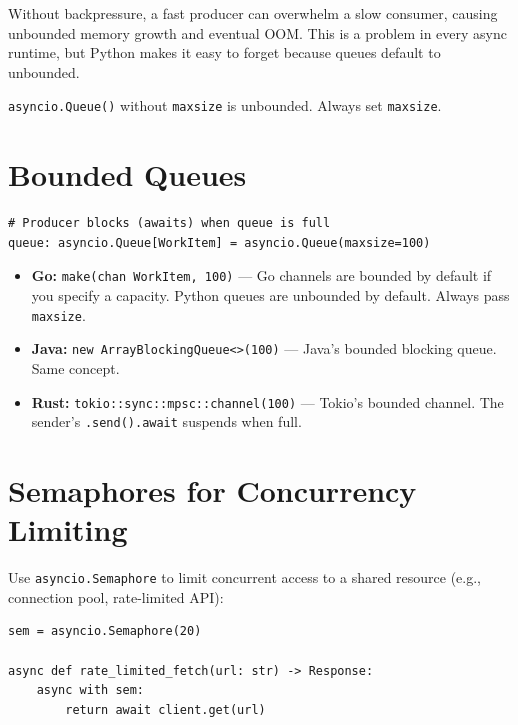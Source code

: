 \documentclass[11pt,a4paper,oneside]{book}
\newcommand{\py}[1]{\texttt{\color{pyblue}#1}}
\newcommand{\gocode}[1]{\texttt{\color{goblue}#1}}
\newcommand{\rustcode}[1]{\texttt{\color{BrickRed}#1}}
\newcommand{\javacode}[1]{\texttt{\color{javaorange!80!black}#1}}
\begin{document}
Without backpressure, a fast producer can overwhelm a slow consumer, causing unbounded memory
growth and eventual OOM. This is a problem in every async runtime, but Python makes it easy
to forget because queues default to unbounded.

\begin{dangerbox}[title={Unbounded queues are a bug}]
\py{asyncio.Queue()} without \py{maxsize} is unbounded. Always set \py{maxsize}.
\end{dangerbox}

\section{Bounded Queues}

\begin{lstlisting}[style=python]
# Producer blocks (awaits) when queue is full
queue: asyncio.Queue[WorkItem] = asyncio.Queue(maxsize=100)
\end{lstlisting}

\begin{analogybox}
\begin{itemize}
    \item \textcolor{goblue}{\textbf{Go:}} \gocode{make(chan WorkItem, 100)} --- Go channels are
          bounded by default if you specify a capacity. Python queues are unbounded by default.
          Always pass \py{maxsize}.
    \item \textcolor{javaorange}{\textbf{Java:}} \javacode{new ArrayBlockingQueue<>(100)} ---
          Java's bounded blocking queue. Same concept.
    \item \textcolor{BrickRed}{\textbf{Rust:}} \rustcode{tokio::sync::mpsc::channel(100)} ---
          Tokio's bounded channel. The sender's \texttt{.send().await} suspends when full.
\end{itemize}
\end{analogybox}

\section{Semaphores for Concurrency Limiting}

Use \py{asyncio.Semaphore} to limit concurrent access to a shared resource (e.g., connection pool,
rate-limited API):

\begin{lstlisting}[style=python]
sem = asyncio.Semaphore(20)

async def rate_limited_fetch(url: str) -> Response:
    async with sem:
        return await client.get(url)
\end{lstlisting}
\end{document}
